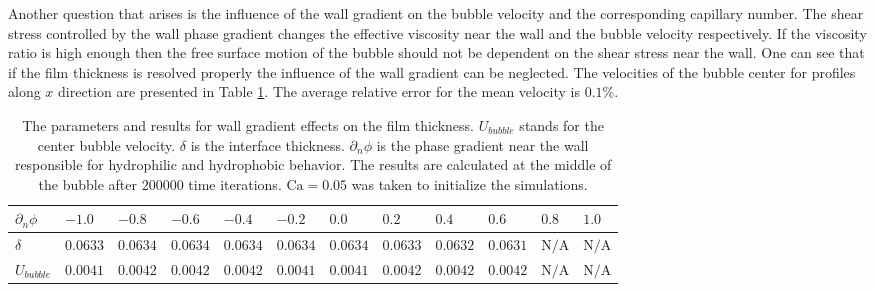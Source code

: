 \documentclass[preprint,12pt]{elsarticle}
\newcommand{\Ca}{\mathrm{Ca}}
\begin{document}
Another question that arises is the influence of the wall gradient on the bubble velocity and the
corresponding capillary number. The shear stress controlled by the wall phase gradient changes the
effective viscosity near the wall and the bubble velocity respectively. If the viscosity ratio is
high enough then the free surface motion of the bubble should not be dependent on the shear stress
near the wall.
One can see that if the film thickness is resolved properly the influence of the wall gradient can
be neglected. The velocities of the bubble center for profiles along $x$ direction are
presented in Table
\ref{table:parameters:wall:gradient}. 
The average relative error for the mean velocity is $0.1\%$.
\begin{table}
\begin{tabularx}{\textwidth}{|X|X X X X X X X X X X X|}
\hline
$\scriptstyle \partial_n \phi$& $\scriptstyle -1.0$& $\scriptstyle -0.8$&
$\scriptstyle -0.6$&$\scriptstyle -0.4$&$\scriptstyle -0.2$&$\scriptstyle
0.0$&$\scriptstyle 0.2$&$\scriptstyle 0.4$&$\scriptstyle 0.6$&$\scriptstyle 0.8$&$\scriptstyle
1.0$\\
\hline
$\scriptstyle \delta$& $\scriptstyle 0.0633$& $\scriptstyle 0.0634$& $\scriptstyle 0.0634$&
$\scriptstyle 0.0634$& $\scriptstyle 0.0634$& $\scriptstyle 0.0634$& $\scriptstyle 0.0633$&
$\scriptstyle 0.0632$& $\scriptstyle 0.0631$ &$\scriptstyle \mathrm{N/A}$&$\scriptstyle
\mathrm{N/A}$\\
\hline
$\scriptstyle U_{bubble}$ &$\scriptstyle 0.0041$& $\scriptstyle 0.0042$& $\scriptstyle 0.0042$
&$\scriptstyle 0.0042$ & $\scriptstyle 0.0041$& $\scriptstyle 0.0041$ & $\scriptstyle 0.0042$ &
$\scriptstyle 0.0042$ & $\scriptstyle 0.0042$ & $\scriptstyle \mathrm{N/A}$ &$\scriptstyle
\mathrm{N/A}$\\
\hline
\end{tabularx}
\caption{The parameters and results for wall gradient effects on the film thickness. $U_{bubble}$
stands for the
center bubble velocity. $\delta$ is the interface thickness. $\partial_n \phi$ is the phase
gradient near the wall responsible for hydrophilic and hydrophobic behavior. The results are
calculated at the middle of the bubble after $200 000$ time iterations. $\Ca=0.05$ was taken to
initialize the simulations.
\label{table:parameters:wall:gradient}}
\end{table}
\end{document}
